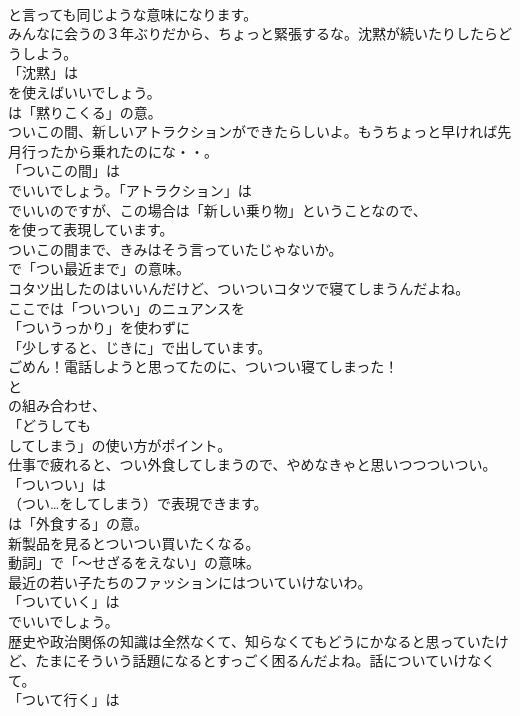 \documentclass[8pt]{extreport}
\begin{document}
\begin{CJK}{UTF8}{min}
\\	と言っても同じような意味になります。	
\\	みんなに会うの３年ぶりだから、ちょっと緊張するな。沈黙が続いたりしたらどうしよう。 
\\	「沈黙」は
\\	を使えばいいでしょう。
\\	は「黙りこくる」の意。	
\\	ついこの間、新しいアトラクションができたらしいよ。もうちょっと早ければ先月行ったから乗れたのにな・・。 
\\	「ついこの間」は
\\	でいいでしょう。「アトラクション」は
\\	でいいのですが、この場合は「新しい乗り物」ということなので、
\\	を使って表現しています。	
\\	ついこの間まで、きみはそう言っていたじゃないか。 
\\	で「つい最近まで」の意味。	
\\	コタツ出したのはいいんだけど、ついついコタツで寝てしまうんだよね。 
\\	ここでは「ついつい」のニュアンスを
\\	「ついうっかり」を使わずに
\\	「少しすると、じきに」で出しています。	
\\	ごめん！電話しようと思ってたのに、ついつい寝てしまった！ 
\\	と
\\	の組み合わせ、
\\	「どうしても 
\\	してしまう」の使い方がポイント。	
\\	仕事で疲れると、つい外食してしまうので、やめなきゃと思いつつついつい。 
\\	「ついつい」は 
\\	（つい…をしてしまう）で表現できます。
\\	は「外食する」の意。	
\\	新製品を見るとついつい買いたくなる。 
\\	動詞」で「～せざるをえない」の意味。	
\\	最近の若い子たちのファッションにはついていけないわ。 
\\	「ついていく」は
\\	でいいでしょう。	
\\	歴史や政治関係の知識は全然なくて、知らなくてもどうにかなると思っていたけど、たまにそういう話題になるとすっごく困るんだよね。話についていけなくて。 
\\	「ついて行く」は

\end{CJK}
\end{document}
